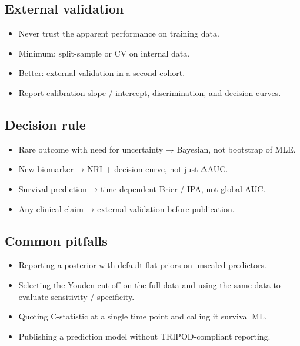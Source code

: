 \documentclass[
]{article}
\providecommand{\tightlist}{%
  \setlength{\itemsep}{0pt}\setlength{\parskip}{0pt}}
\begin{document}
\subsection{External validation}\label{external-validation}

\begin{itemize}
\tightlist
\item
  Never trust the apparent performance on training data.
\item
  Minimum: split-sample or CV on internal data.
\item
  Better: external validation in a second cohort.
\item
  Report calibration slope / intercept, discrimination, and decision
  curves.
\end{itemize}

\subsection{Decision rule}\label{decision-rule-14}

\begin{itemize}
\tightlist
\item
  Rare outcome with need for uncertainty → Bayesian, not bootstrap of
  MLE.
\item
  New biomarker → NRI + decision curve, not just ΔAUC.
\item
  Survival prediction → time-dependent Brier / IPA, not global AUC.
\item
  Any clinical claim → external validation before publication.
\end{itemize}

\subsection{Common pitfalls}\label{common-pitfalls-14}

\begin{itemize}
\tightlist
\item
  Reporting a posterior with default flat priors on unscaled predictors.
\item
  Selecting the Youden cut-off on the full data and using the same data
  to evaluate sensitivity / specificity.
\item
  Quoting C-statistic at a single time point and calling it survival ML.
\item
  Publishing a prediction model without TRIPOD-compliant reporting.
\end{itemize}
\end{document}
